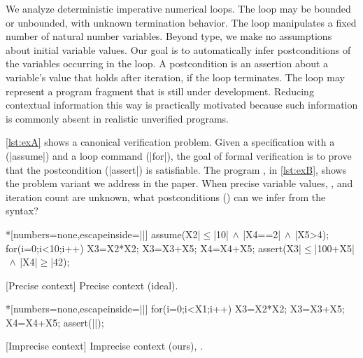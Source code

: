 We analyze deterministic imperative numerical loops.
The loop may be bounded or unbounded, with unknown termination behavior.
The loop manipulates a fixed number of natural number variables.
Beyond type, we make no assumptions about initial variable values.
Our goal is to automatically infer postconditions of the variables occurring in the loop.
A postcondition is an assertion about a variable's value that holds after iteration, if the loop terminates.
The loop may represent a program {fragment} that is still under development. %
Reducing contextual information this way is practically motivated because such information is commonly absent in realistic unverified programs.

\autoref{lst:exA} shows a canonical verification problem.
Given a specification with a  (\pr|assume|) and a loop command (\pr|for|), the goal of formal verification is to prove that the postcondition (\pr|assert|) is satisfiable.
The program \emph{\explain}, in \autoref{lst:exB}, shows the problem variant we address in the paper.
When precise variable values, , and iteration count are unknown, what postconditions (\qtext) can we infer from the syntax?

\begin{center}
\begin{minipage}{.45\textwidth}
\captionsetup{type=lstlisting}
\begin{center}
\begin{minipage}{.9\textwidth}
\begin{implisting}*[numbers=none,escapeinside=||]
assume(X2|$\leq$|10|$\,\land\,$|X4==2|$\,\land\,$|X5>4);
for(i=0;i<10;i++) {
  X3=X2*X2;
  X3=X3+X5;
  X4=X4+X5; }
assert(X3|$\leq$|100+X5|$\,\land\,$|X4|$\geq$|42);
\end{implisting}
\end{minipage}
\end{center}
[Precise context]
{Precise context (ideal).}\label{lst:exA}
\end{minipage}\hfill%
\begin{minipage}{.52\textwidth}
\captionsetup{type=lstlisting}
\begin{center}
\begin{minipage}{.85\textwidth}
\begin{implisting}*[numbers=none,escapeinside=||]
for(i=0;i<X1;i++) {
  X3=X2*X2;
  X3=X3+X5;
  X4=X4+X5; }
assert(|\myqm|);
\end{implisting}
\end{minipage}
\end{center}
[Imprecise context]
{Imprecise context (ours), \mbox{\explain}.}\label{lst:exB}
\end{minipage}
\end{center}

